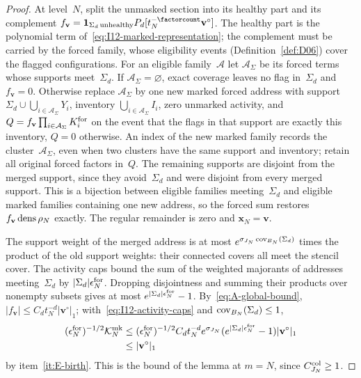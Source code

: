 \begin{proof}
At level~$N$, split the unmasked section into its healthy part and its complement $f_{\mathbf v}=\mathbf1_{\Sigma_d\,\mathrm{unhealthy}}P_d[t_N^{-\factorcount}\mathbf v^\circ]$. The healthy part is the polynomial term of~\eqref{eq:I12-marked-representation}; the complement must be carried by the forced family, whose eligibility events (Definition~\ref{def:D06}) cover the flagged configurations. For an eligible family~$\mathcal A$ let $\mathcal A_\Sigma$ be its forced terms whose supports meet~$\Sigma_d$. If $\mathcal A_\Sigma=\varnothing$, exact coverage leaves no flag in~$\Sigma_d$ and $f_{\mathbf v}=0$. Otherwise replace $\mathcal A_\Sigma$ by one new marked forced address with support $\Sigma_d\cup\bigcup_{i\in\mathcal A_\Sigma}Y_i$, inventory $\bigcup_{i\in\mathcal A_\Sigma}I_i$, zero unmarked activity, and $Q=f_{\mathbf v}\prod_{i\in\mathcal A_\Sigma}K_i^{\rm for}$ on the event that the flags in that support are exactly this inventory, $Q=0$ otherwise. An index of the new marked family records the cluster~$\mathcal A_\Sigma$, even when two clusters have the same support and inventory; retain all original forced factors in~$Q$. The remaining supports are disjoint from the merged support, since they avoid~$\Sigma_d$ and were disjoint from every merged support. This is a bijection between eligible families meeting~$\Sigma_d$ and eligible marked families containing one new address, so the forced sum restores $f_{\mathbf v}\operatorname{dens}\rho_N$ exactly. The regular remainder is zero and $\mathbf x_N=\mathbf v$.

The support weight of the merged address is at most $e^{\sigma_{J_N}\operatorname{cov}_{B_N}(\Sigma_d)}$ times the product of the old support weights: their connected covers all meet the stencil cover. The activity caps bound the sum of the weighted majorants of addresses meeting~$\Sigma_d$ by $|\Sigma_d|\epsilon_N^{\rm for}$. Dropping disjointness and summing their products over nonempty subsets gives at most $e^{|\Sigma_d|\epsilon_N^{\rm for}}-1$. By~\eqref{eq:A-global-bound}, $|f_{\mathbf v}|\le C_dt_N^{-d}|\mathbf v^\circ|_1$; with~\eqref{eq:I12-activity-caps} and $\operatorname{cov}_{B_N}(\Sigma_d)\le1$,
\begin{equation*}
\begin{aligned}
 (\epsilon_N^{\rm for})^{-1/2}\mathcal K^{\rm mk}_N
 &\le(\epsilon_N^{\rm for})^{-1/2}C_dt_N^{-d}e^{\sigma_{J_N}}
 (e^{|\Sigma_d|\epsilon_N^{\rm for}}-1)|\mathbf v^\circ|_1\\
 &\le|\mathbf v^\circ|_1
\end{aligned}
\end{equation*}
by item~\ref{it:E-birth}. This is the bound of the lemma at $m=N$, since $C^{\rm col}_{J_N}\ge1$.


\end{proof}
